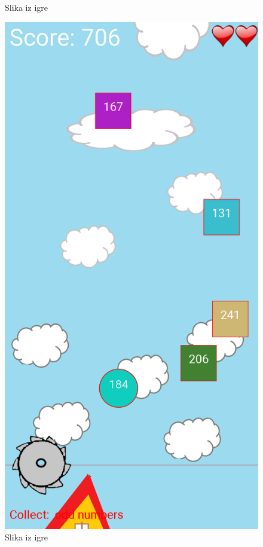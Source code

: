 \documentclass[times, utf8, zavrsni, numeric]{fer}
\begin{document}
\begin{figure}[!htb]
\begin{minipage}{0.45\textwidth}
				\caption{Slika iz igre}
				\label{fig:slikaigre1}
			\end{minipage}\hfill
			\begin{minipage}{0.45\textwidth}
				\centering
				\includegraphics[scale=0.15]{"slike/slikaigre2.png"} 
				\caption{Slika iz igre}
				\label{fig:slikaigre2}
			\end{minipage}
		\end{figure}
	
\end{document}
